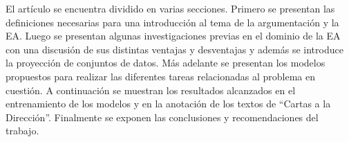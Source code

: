 \documentclass[a4paper,11pt,twocolumn,twoside]{article}
\begin{document}



El artículo se encuentra dividido en varias secciones. Primero se presentan las definiciones 
necesarias para una introducción al tema de la argumentación y la EA. Luego se presentan 
algunas investigaciones previas en el dominio de la EA con una discusión de sus distintas 
ventajas y desventajas y además se introduce la proyección de conjuntos de datos. Más adelante 
se presentan los modelos propuestos para realizar las diferentes tareas relacionadas al problema en 
cuestión. A continuación se muestran los resultados alcanzados en el entrenamiento de los modelos y en 
la anotación de los textos de ``Cartas a la Dirección''. Finalmente se exponen las conclusiones y 
recomendaciones del trabajo.
\end{document}

